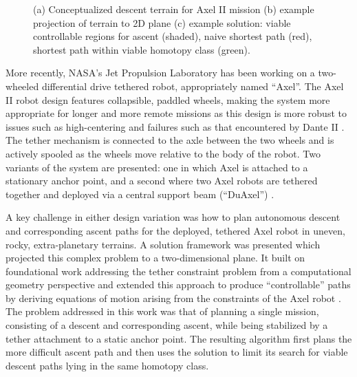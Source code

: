 \documentclass[12pt]{article}
\begin{document}
\begin{figure}
\begin{subfigure}{.2\textwidth}
    \caption{}
    \label{fig:planarpath}
  \end{subfigure}  %
  \label{fig:dsolution}
  \vspace{-0.1in}
  \caption{(a) Conceptualized descent terrain for Axel II mission (b) example projection of terrain to 2D plane
  (c) example solution: viable controllable regions for ascent (shaded), naive shortest path (red), shortest path within 
  viable homotopy class (green). }
\end{figure}


More recently, NASA's Jet Propulsion Laboratory has been working on a
two-wheeled differential drive tethered robot, appropriately named
``Axel''. The Axel II robot design features collapsible, paddled
wheels, making the system more appropriate for longer and more remote
missions as this design is more robust to issues such as
high-centering and failures such as that encountered by Dante II
\cite{axel_design}. The tether mechanism is connected to the axle
between the two wheels and is actively spooled as the wheels move
relative to the body of the robot.  Two variants of the system are
presented: one in which Axel is attached to a stationary anchor point,
and a second where two Axel robots are tethered together and deployed
via a central support beam (``DuAxel'') \cite{duaxel}.


A key challenge in either design variation was how to plan autonomous
descent and corresponding ascent paths for the deployed, tethered Axel
robot in uneven, rocky, extra-planetary terrains.  A solution
framework was presented which projected this complex problem to a
two-dimensional plane. It built on foundational work addressing the
tether constraint problem from a computational geometry perspective
\cite{ties_that_bind, min_homotopies} and extended this approach to
produce ``controllable'' paths by deriving equations of motion arising
from the constraints of the Axel robot \cite{axel_planning}.  The
problem addressed in this work was that of planning a single mission,
consisting of a descent and corresponding ascent, while being
stabilized by a tether attachment to a static anchor point.  The
resulting algorithm first plans the more difficult ascent path and
then uses the solution to limit its search for viable descent paths
lying in the same homotopy class.

\end{document}
